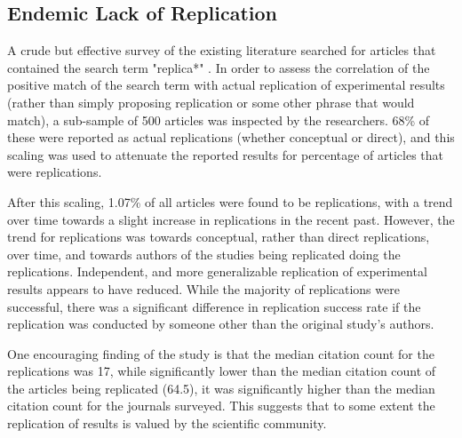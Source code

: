 \documentclass[12pt,a4paper,titlepage]{scrreprt}
\begin{document}
\subsection{Endemic Lack of Replication}

A crude but effective survey of the existing literature searched for articles that contained the search term "replica*" \parencite{makel_replications_2012}. In order to assess the correlation of the positive match of the search term with actual replication of experimental results (rather than simply proposing replication or some other phrase that would match), a sub-sample of 500 articles was inspected by the researchers. 68\% of these were reported as actual replications (whether conceptual or direct), and this scaling was used to attenuate the reported results for percentage of articles that were replications.

After this scaling, 1.07\% of all articles were found to be replications, with a trend over time towards a slight increase in replications in the recent past. However, the trend for replications was towards conceptual, rather than direct replications, over time, and towards authors of the studies being replicated doing the replications. Independent, and more generalizable replication of experimental results appears to have reduced.
While the majority of replications were successful, there was a significant difference in replication success rate if the replication was conducted by someone other than the original study's authors.

One encouraging finding of the study is that the median citation count for the replications was 17, while significantly lower than the median citation count of the articles being replicated (64.5), it was significantly higher than the median citation count for the journals surveyed. This suggests that to some extent the replication of results is valued by the scientific community.
\end{document}

